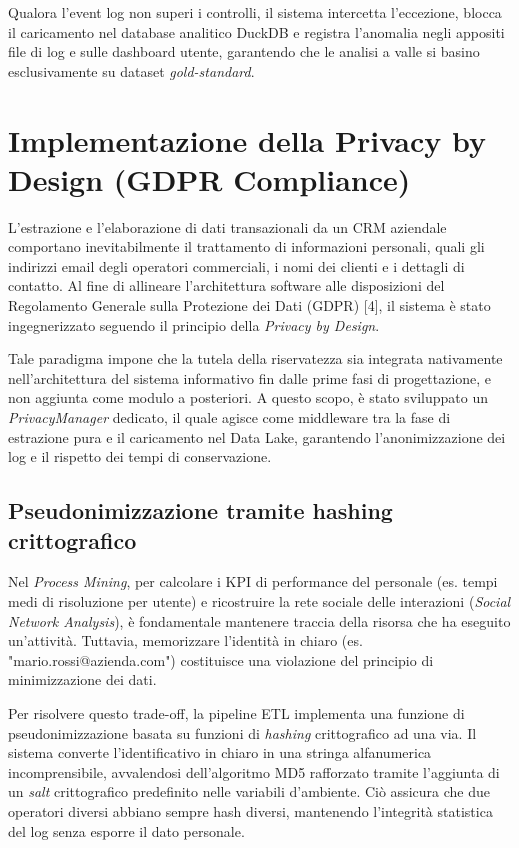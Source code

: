 \documentclass[12pt, a4paper]{report}
\begin{document}
Qualora l'event log non superi i controlli, il sistema intercetta l'eccezione, blocca il caricamento nel database analitico DuckDB e registra l'anomalia negli appositi file di log e sulle dashboard utente, garantendo che le analisi a valle si basino esclusivamente su dataset \textit{gold-standard}.

\section{Implementazione della Privacy by Design (GDPR Compliance)}
L'estrazione e l'elaborazione di dati transazionali da un CRM aziendale comportano inevitabilmente il trattamento di informazioni personali, quali gli indirizzi email degli operatori commerciali, i nomi dei clienti e i dettagli di contatto. Al fine di allineare l'architettura software alle disposizioni del Regolamento Generale sulla Protezione dei Dati (GDPR) [4], il sistema è stato ingegnerizzato seguendo il principio della \textit{Privacy by Design}. 

Tale paradigma impone che la tutela della riservatezza sia integrata nativamente nell'architettura del sistema informativo fin dalle prime fasi di progettazione, e non aggiunta come modulo a posteriori. A questo scopo, è stato sviluppato un \textit{PrivacyManager} dedicato, il quale agisce come middleware tra la fase di estrazione pura e il caricamento nel Data Lake, garantendo l'anonimizzazione dei log e il rispetto dei tempi di conservazione.

\subsection{Pseudonimizzazione tramite hashing crittografico}
Nel \textit{Process Mining}, per calcolare i KPI di performance del personale (es. tempi medi di risoluzione per utente) e ricostruire la rete sociale delle interazioni (\textit{Social Network Analysis}), è fondamentale mantenere traccia della risorsa che ha eseguito un'attività. Tuttavia, memorizzare l'identità in chiaro (es. "mario.rossi@azienda.com") costituisce una violazione del principio di minimizzazione dei dati.

Per risolvere questo trade-off, la pipeline ETL implementa una funzione di pseudonimizzazione basata su funzioni di \textit{hashing} crittografico ad una via. Il sistema converte l'identificativo in chiaro in una stringa alfanumerica incomprensibile, avvalendosi dell'algoritmo MD5 rafforzato tramite l'aggiunta di un \textit{salt} crittografico predefinito nelle variabili d'ambiente. Ciò assicura che due operatori diversi abbiano sempre hash diversi, mantenendo l'integrità statistica del log senza esporre il dato personale.
\end{document}
